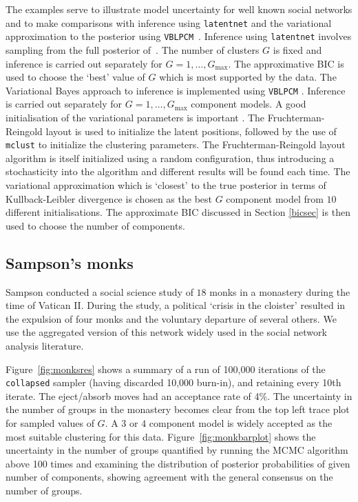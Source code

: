 \documentclass[12pt]{article}
\begin{document}
The examples serve to illustrate model uncertainty for well known social networks and to make comparisons with inference using \texttt{latentnet} \cite{Kriv:Hand07,Kriv:Hand13} and the variational approximation to the posterior using \texttt{VBLPCM}~\cite{salter:murphy12}. Inference using \texttt{latentnet} involves sampling  from the full posterior of~. The number of clusters $G$ is fixed and inference is carried out separately for $G=1,\ldots,G_{\mathrm{max}}$. The approximative BIC is used to choose the `best' value of $G$ which is most supported by the data. The Variational Bayes approach to inference is implemented using \texttt{VBLPCM} \cite{salter:murphy12}. 
Inference is carried out separately for $G=1,\ldots,G_{\mathrm{max}}$ component models. A good initialisation of the variational parameters is important \cite{salter:murphy12}. The Fruchterman-Reingold layout is used to initialize the latent positions, followed by the use of \texttt{mclust} \cite{fraley:raftery02,fraley:raftery03}
to initialize the clustering parameters. 
The Fruchterman-Reingold layout algorithm is itself initialized using a random configuration, thus introducing a stochasticity into the algorithm and different results will be found each time. The variational approximation which is `closest' to the true posterior in terms of Kullback-Leibler divergence is chosen as the best $G$ component model from $10$ different initialisations. The approximate BIC discussed in Section \ref{bicsec} is then used to choose the number of components. 

\subsection{Sampson's monks}\label{resmonks}


Sampson \citeyear{sampson68} conducted a social science study of  $18$ monks in a monastery during the time of Vatican II. During the study, a political `crisis in 
the cloister' resulted in the expulsion of four monks and the voluntary departure of several others.
We use the aggregated version of this network widely used in the social network analysis literature. 



Figure~\ref{fig:monksres} shows a summary of a run of 100,000 iterations of the \texttt{collapsed} sampler (having discarded 10,000 burn-in), and retaining every 10th iterate. The eject/absorb moves had an acceptance rate of 4\%. The uncertainty in the number of groups in the monastery becomes clear from the top left trace plot for sampled values of $G$. A $3$ or $4$ component model is widely accepted as the most suitable clustering for this data. Figure~\ref{fig:monkbarplot} shows the uncertainty in the number of groups quantified by running the MCMC algorithm above 100 times and examining the distribution of posterior probabilities of given number of components, showing agreement with the general consensus on the number of groups. 
\end{document}
